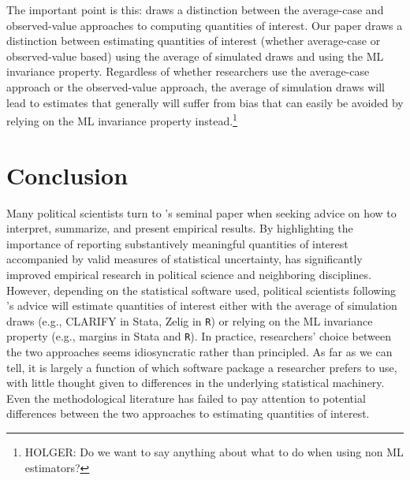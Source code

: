 \documentclass[11pt]{article}
\begin{document}
The important point is this: \cite{HanmerKalkan2013} draws a distinction between the average-case and observed-value approaches to computing
quantities of interest.
Our paper draws a distinction between estimating quantities of interest (whether average-case or observed-value based) using the average of simulated draws and using the ML invariance property.
Regardless of whether researchers use the average-case approach or the observed-value approach, the average of simulation draws will lead to estimates that generally will suffer from bias that can easily be avoided by relying on the ML invariance property instead.\footnote{\color{red} HOLGER: Do we want to say anything about what to do when using non ML estimators?}

\section*{Conclusion}

Many political scientists turn to \cite{KingTomzWittenberg2000}'s seminal paper when seeking advice on how to interpret, summarize, and present empirical results.
By highlighting the importance of reporting substantively meaningful quantities of interest accompanied by valid measures of statistical uncertainty, \cite{KingTomzWittenberg2000} has significantly improved empirical research in political science and neighboring disciplines.
However, depending on the statistical software used, political scientists following \cite{KingTomzWittenberg2000}'s advice will estimate quantities of interest either with the average of simulation draws (e.g., CLARIFY in Stata, Zelig in \texttt{R}) or relying on the ML invariance property (e.g., margins in Stata and \texttt{R}).
In practice, researchers' choice between the two approaches seems idiosyncratic rather than principled.
As far as we can tell, it is largely a function of which software package a researcher prefers to use, with little thought given to differences in the underlying statistical machinery.
Even the methodological literature has failed to pay attention to potential differences between the two approaches to estimating quantities of interest.
\end{document}
